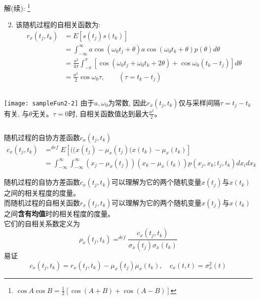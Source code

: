 \begin{frame}
解(续): \footnote{$\cos A\cos B=\frac{1}{2}[\cos (A+B)+\cos(A-B)]$}
\begin{enumerate}
\setcounter{enumi}{1} %
\item 该随机过程的自相关函数为:
\begin{align*}
r_x(t_j,t_k)&=E[s(t_j)s(t_k)]\\
&=\int_{-\infty}^{\infty}a\cos(\omega_0t_j+\theta)a\cos(\omega_0t_k+\theta)p(\theta)d\theta\\
&=\frac{a^2}{4\pi}\int_{-\pi}^{\pi}[\cos(\omega_0t_j+\omega_0t_k+2\theta)+\cos\omega_0(t_k-t_j)]d\theta\\
&=\frac{a^2}{2}\cos\omega_0\tau,\qquad(\tau=t_k-t_j)
\end{align*}
\end{enumerate}
\begin{columns}
	\texttt{[image: sampleFun2-2]}
	由于$a,\omega_0$为常数, 因此$r_x(t_j,t_k)$仅与采样间隔$\tau=t_j-t_k$有关, 与$\theta$无关。$\tau=0$时, 自相关函数值达到最大$\frac{a^2}{2}$。
\end{columns}
\end{frame}

\begin{frame}
\begin{block}{随机过程的自协方差函数$c_x(t_j,t_k)$}
\begin{align*}
c_x(t_j,t_k)&\mathop{=}^{def}E[((x(t_j)-\mu_x(t_j)(x(t_k)-\mu_x(t_k)]\\
&=\int_{-\infty}^{\infty}\int_{-\infty}^{\infty}(x_j-\mu_x(t_j))(x_k-\mu_x(t_k))p(x_j,x_k;t_j,t_k)dx_idx_k
\end{align*}
\end{block}
随机过程的自协方差函数$c_x(t_j,t_k)$可以理解为它的两个随机变量$x(t_j)$与$x(t_k)$之间的相关程度的度量。\\
而随机过程的自相关函数$r_x(t_j,t_k)$可以理解为它的两个随机变量$x(t_j)$与$x(t_k)$之间\textbf{含有均值}时的相关程度的度量。\\
它们的自相关系数定义为
\[\rho_x(t_j,t_k)\mathop{=}^{def}\frac{c_x(t_j,t_k)}{\sigma_x(t_j)\sigma_x(t_k)}\]
易证
\[c_x(t_j,t_k)=r_x(t_j,t_k)-\mu_x(t_j)\mu_x(t_k),\quad c_x(t,t)=\sigma_x^2(t)\]
\end{frame}

